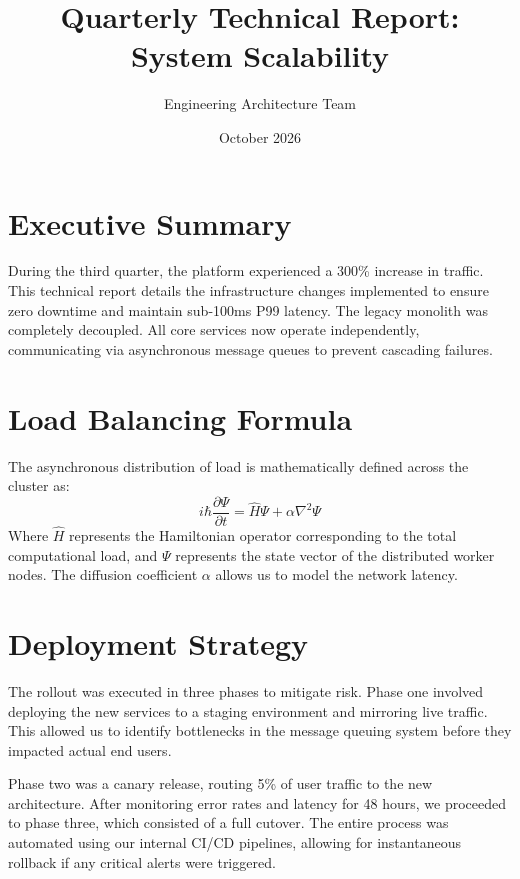 \documentclass[10pt,a4paper]{article}
\begin{document}
\title{\vspace{-10mm}\textbf{Quarterly Technical Report: System Scalability}}
\author{Engineering Architecture Team}
\date{October 2026}
\maketitle

\section{Executive Summary}
During the third quarter, the platform experienced a 300\% increase in traffic. This technical report details the infrastructure changes implemented to ensure zero downtime and maintain sub-100ms P99 latency. The legacy monolith was completely decoupled. All core services now operate independently, communicating via asynchronous message queues to prevent cascading failures.

\section{Load Balancing Formula}
The asynchronous distribution of load is mathematically defined across the cluster as:
\begin{equation}
i\hbar \frac{\partial \Psi}{\partial t} = \hat{H}\Psi + \alpha \nabla^2 \Psi
\end{equation}
Where $\hat{H}$ represents the Hamiltonian operator corresponding to the total computational load, and $\Psi$ represents the state vector of the distributed worker nodes. The diffusion coefficient $\alpha$ allows us to model the network latency.

\section{Deployment Strategy}
The rollout was executed in three phases to mitigate risk. Phase one involved deploying the new services to a staging environment and mirroring live traffic. This allowed us to identify bottlenecks in the message queuing system before they impacted actual end users. 

Phase two was a canary release, routing 5\% of user traffic to the new architecture. After monitoring error rates and latency for 48 hours, we proceeded to phase three, which consisted of a full cutover. The entire process was automated using our internal CI/CD pipelines, allowing for instantaneous rollback if any critical alerts were triggered.
\end{document}
